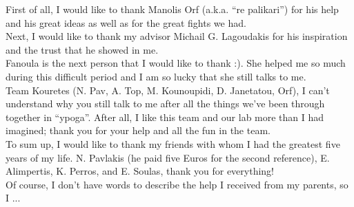 \begin{acknowledgementslong}

\noindent
First of all, I would like to thank Manolis Orf (a.k.a. ``re palikari'') for his help and his great ideas as well as for the great fights we had. \\

\noindent
Next, I would like to thank my advisor Michail G. Lagoudakis for his inspiration and the trust that he showed in me.\\

\noindent
Fanoula is the next person that I would like to thank :). She helped me so much during this difficult period and I am so lucky that she still talks to me.\\

\noindent
Team Kouretes (N. Pav, A. Top, M. Kounoupidi, D. Janetatou, Orf), I can't understand why you still talk to me after all the things we've been through together in ``ypoga''. After all, I like this team and our lab more than I had imagined; thank you for your help and all the fun in the team.\\

\noindent
To sum up, I would like to thank my friends with whom I had the greatest five years of my life. N. Pavlakis (he paid five Euros for the second reference), E. Alimpertis, K. Perros, and E. Soulas, thank you for everything!\\

\noindent
Of course, I don't have words to describe the help I received from my parents, so I ...

\end{acknowledgementslong}